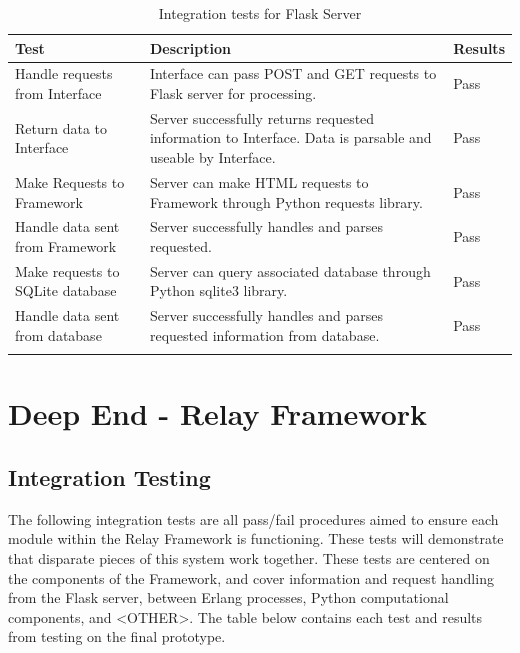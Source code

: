 \documentclass{report}
\begin{document}
\begin{longtable}[H] {| P{3.5cm} | P{10cm} | P{1.5cm} |}
    \hline
    Test                             & Description                                                                                                 & Results \\ \hline
    Handle requests from Interface   &  Interface can pass POST and GET requests to Flask server for processing.                                   & Pass    \\ \hline
    Return data to Interface         &  Server successfully returns requested information to Interface. Data is parsable and useable by Interface. & Pass    \\ \hline
    Make Requests to Framework       &  Server can make HTML requests to Framework through Python requests library.                                & Pass    \\ \hline
    Handle data sent from Framework  &  Server successfully handles and parses requested.                                                          & Pass    \\ \hline
    Make requests to SQLite database &  Server can query associated database through Python sqlite3 library.                                       & Pass    \\ \hline
    Handle data sent from database   &  Server successfully handles and parses requested information from database.                                &  Pass   \\ \hline
\caption{Integration tests for Flask Server}
\end{longtable}

\section{Deep End - Relay Framework}
\subsection{Integration Testing}
The following integration tests are all pass/fail procedures aimed to ensure each module within the Relay Framework is functioning. 
These tests will demonstrate that disparate pieces of this system work together. 
These tests are centered on the components of the Framework, and cover information and request handling from the Flask server, between Erlang processes, Python computational components, and <OTHER>. 
The table below contains each test and results from testing on the final prototype.
\end{document}
